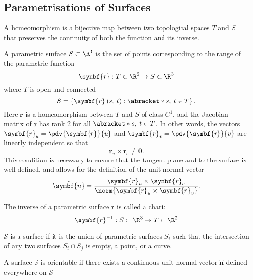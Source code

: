 \documentclass{article}
\begin{document}
\subsection{Parametrisations of Surfaces}
\begin{definition}[Homeomorphism]
    A homeomorphism is a bijective map between two topological spaces
    \(T\) and \(S\) that preserves the continuity of both the function
    and its inverse.
\end{definition}
\begin{definition}
    A parametric surface \(S \subset \R^3\) is the set of points
    \linebreak corresponding to the range of the parametric function
    \begin{equation*}
        \symbf{r} : T \subset \R^2 \to S \subset \R^3
    \end{equation*}
    where \(T\) is open and connected
    \begin{equation*}
        S = \left\{ \symbf{r}\left( s,\: t \right) : \abracket*{s,\: t} \in T \right\}.
    \end{equation*}
    Here \(\symbf{r}\) is a homeomorphism between \(T\) and \(S\) of
    class \(C^1\), and the Jacobian matrix of \(\symbf{r}\) has rank 2
    for all \(\abracket*{s,\: t} \in T\).
    In other words, the vectors \(\symbf{r}_u = \pdv{\symbf{r}}{u}\) and
    \(\symbf{r}_v = \pdv{\symbf{r}}{v}\) are linearly independent so
    that
    \begin{equation*}
        \symbf{r}_u \times \symbf{r}_v \neq \symbf{0}.
    \end{equation*}
    This condition is necessary to ensure that the tangent plane and
    to the surface is well-defined, and allows for the definition of
    the unit normal vector
    \begin{equation*}
        \hat{\symbf{n}} = \frac{\symbf{r}_u \times \symbf{r}_v}{\norm{\symbf{r}_u \times \symbf{r}_v}}.
    \end{equation*}
\end{definition}
\begin{definition}[Chart]
    The inverse of a parametric surface \(\symbf{r}\) is called a chart:
    \begin{equation*}
        \symbf{r}^{-1} : S \subset \R^3 \to T \subset \R^2
    \end{equation*}
\end{definition}
\begin{definition}[Surface]
    \(\mathscr{S}\) is a surface if it is the union of parametric
    surfaces \(S_i\) such that the intersection of any two surfaces
    \(S_i \cap S_j\) is empty, a point, or a curve.
\end{definition}
\begin{definition}
    A surface \(\mathscr{S}\) is orientable if there exists a
    continuous unit normal vector \(\hat{\symbf{n}}\) defined everywhere
    on \(\mathscr{S}\).
\end{definition}
\end{document}
